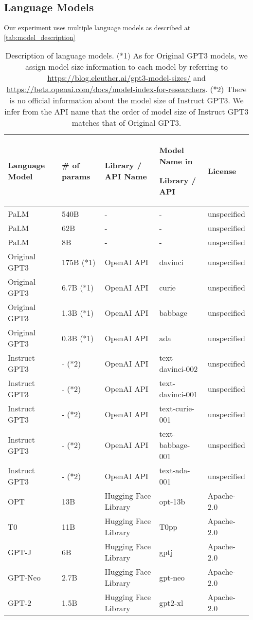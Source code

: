 \documentclass{article}
\begin{document}
\subsection{Language Models}
\label{appx:model_description}

Our experiment uses multiple language models as described at \autoref{tab:model_description}

\begin{table}[h]
\centering
\footnotesize
\caption{Description of language models. (*1) As for Original GPT3 models, we assign model size information to each model by referring to \url{https://blog.eleuther.ai/gpt3-model-sizes/}
and \url{https://beta.openai.com/docs/model-index-for-researchers}. 
(*2) There is no official information about the model size of Instruct GPT3. We infer from the API name that the order of model size of Instruct GPT3 matches that of Original GPT3.}
\label{tab:model_description}
\begin{tabular}{lllll}\toprule
Language Model &\# of params &Library / API Name &Model Name in \par Library / API &License \\\midrule \midrule

PaLM &540B &- &- &unspecified \\
PaLM &62B &- &- &unspecified \\
PaLM &8B &- &- &unspecified \\

\midrule

Original GPT3 &175B (*1) &OpenAI API &davinci &unspecified \\
Original GPT3 &6.7B (*1) &OpenAI API &curie &unspecified \\
Original GPT3 &1.3B (*1) &OpenAI API &babbage &unspecified \\
Original GPT3 &0.3B (*1) &OpenAI API &ada &unspecified \\

\midrule

Instruct GPT3 &- (*2) &OpenAI API &text-davinci-002 &unspecified \\
Instruct GPT3 &- (*2) &OpenAI API &text-davinci-001 &unspecified \\
Instruct GPT3 &- (*2) &OpenAI API &text-curie-001 &unspecified \\
Instruct GPT3 &- (*2) &OpenAI API &text-babbage-001 &unspecified \\
Instruct GPT3 &- (*2) &OpenAI API &text-ada-001 &unspecified \\

\midrule

OPT &13B &Hugging Face Library &opt-13b &Apache-2.0 \\
T0 &11B &Hugging Face Library &T0pp &Apache-2.0 \\
GPT-J &6B &Hugging Face Library &gptj &Apache-2.0 \\
GPT-Neo &2.7B &Hugging Face Library &gpt-neo &Apache-2.0 \\
GPT-2 &1.5B &Hugging Face Library &gpt2-xl &Apache-2.0 \\
\bottomrule
\end{tabular}
\end{table} 
\end{document}
